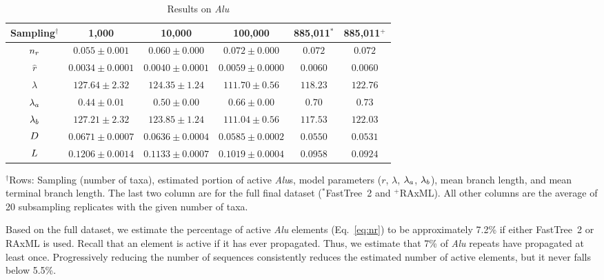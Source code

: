 \begin{table}[!ht] %
\caption[Results on \textit{Alu}]{Results on \textit{Alu}}
\vspace{-0.25in}
\begin{center}
\begin{small}
\begin{tabular}{|c|c|c|c|c|c|}
\hline
\textbf{Sampling$^\dagger$} & 1,000 & 10,000 & 100,000 & 885,011$^*$ & 885,011$^+$\\
\hline
$n_r$ & $0.055\pm0.001$ & $0.060\pm0.000$ & $0.072\pm0.000$ & $0.072$ & $0.072$\\
\hline
$\hat{r}$ & $0.0034\pm0.0001$ & $0.0040\pm0.0001$ & $0.0059\pm0.0000$ & $0.0060$ & $0.0060$\\
\hline
$\lambda$ & $127.64\pm2.32$ & $124.35\pm1.24$ & $111.70\pm0.56$ & $118.23$ & $122.76$\\
\hline
$\lambda_a$ & $0.44\pm0.01$ & $0.50\pm0.00$ & $0.66\pm0.00$ & $0.70$ & $0.73$\\
\hline
$\lambda_b$ & $127.21\pm2.32$ & $123.85\pm1.24$ & $111.04\pm0.56$ & $117.53$ & $122.03$\\
\hline
$D$ & $0.0671\pm0.0007$ & $0.0636\pm0.0004$ & $0.0585\pm0.0002$ & $0.0550$ & $0.0531$\\
\hline
$L$ & $0.1206\pm0.0014$ & $0.1133\pm0.0007$ & $0.1019\pm0.0004$ & $0.0958$ & $0.0924$\\
\hline
\end{tabular}
\end{small}
\end{center}
$^\dagger$Rows: Sampling (number of taxa), estimated portion of active \textit{Alu}s, model parameters ($r$, $\lambda$, $\lambda_a$, $\lambda_b$), mean branch length, and mean terminal branch length. The last two column are for the full final dataset ($^*$FastTree~2 and $^+$RAxML). All other columns are the average of 20 subsampling replicates with the given number of taxa.
\label{tab:dualbirth-alu}
\end{table}

Based on the full dataset, we estimate the percentage of active \textit{Alu} elements (Eq.~\ref{eq:nr}) to be approximately 7.2\% if either FastTree~2 or RAxML is used. Recall that an element is active if it has ever propagated. Thus, we estimate that 7\% of \textit{Alu} repeats have propagated at least once. Progressively reducing the number of sequences consistently reduces the estimated number of active elements, but it never falls below 5.5\%.

